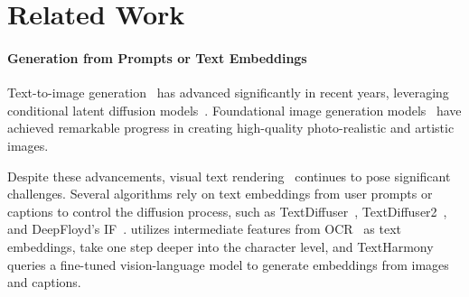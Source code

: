 \section{Related Work}
\paragraph{Generation from Prompts or Text Embeddings} Text-to-image generation~\cite{zhang2023text, bie2023renaissance} has advanced significantly in recent years, leveraging conditional latent diffusion models~\cite{ho2020denoising, rombach2022high, zhang2023adding}. Foundational image generation models~\cite{ramesh2021zero, betker2023improving, midjourney, saharia2022photorealistic, flux1_ai, esser2024scaling, yang2024cross, zhao2023unleashing, hoe2024interactdiffusion, sun2025anycontrol, chang2022maskgit} have achieved remarkable progress in creating high-quality photo-realistic and artistic images. 

Despite these advancements, visual text rendering~\cite{bai2024intelligent, han2024ace, li2024hfh} continues to pose significant challenges.
Several algorithms rely on text embeddings from user prompts or captions to control the diffusion process, such as TextDiffuser~\cite{chen2024textdiffuser}, TextDiffuser2~\cite{chen2025textdiffuser}, and DeepFloyd's IF~\cite{deepfloyd_if}. \citet{li2024empowering} utilizes intermediate features from OCR~\cite{du2020pp} as text embeddings, \citet{liu2022character, wang2024high, choi2024towards} take one step deeper into the character level,
and TextHarmony~\cite{zhao2024harmonizing} queries a fine-tuned vision-language model to generate embeddings from images and captions. 


